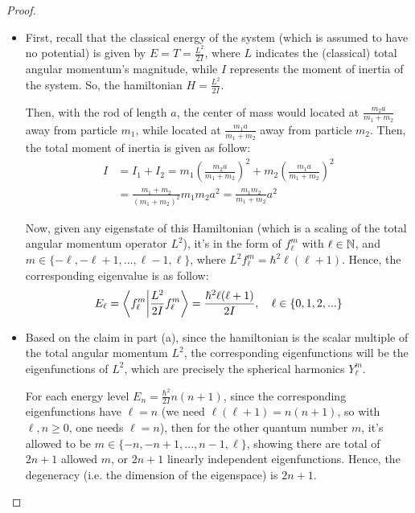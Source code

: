 \documentclass{article}
\begin{document}
\begin{proof}

    \hfil

    \begin{itemize}
        \item[(a)] First, recall that the classical energy of the system (which is assumed to have no potential) is given by $E = T = \frac{L^2}{2I}$, where $L$ indicates the (classical) total angular momentum's magnitude, while $I$ represents the moment of inertia of the system. So, the hamiltonian $H = \frac{L^2}{2I}$. 
        
        Then, with the rod of length $a$, the center of mass would located at $\frac{m_2 a}{m_1+m_2}$ away from particle $m_1$, while located at $\frac{m_1 a}{m_1+m_2}$ away from particle $m_2$. Then, the total moment of inertia is given as follow:
        \begin{align}
            I &= I_1+I_2 = m_1\left(\frac{m_2 a}{m_1+m_2}\right)^2+m_2\left(\frac{m_1 a}{m_1+m_2}\right)^2\\
            &= \frac{m_1+m_2}{(m_1+m_2)^2}m_1m_2a^2 = \frac{m_1m_2}{m_1+m_2}a^2
        \end{align}
        
        Now, given any eigenstate of this Hamiltonian (which is a scaling of the total angular momentum operator $L^2$), it's in the form of $f^m_\ell$ with $\ell\in\mathbb{N}$, and $m\in \{-\ell, -\ell+1,..., \ell-1, \ell\}$, where $L^2 f^m_\ell = \hbar^2 \ell(\ell+1)$. Hence, the corresponding eigenvalue is as follow:
        \begin{align}
            E_\ell = \braket{f^m_\ell}{\frac{L^2}{2I}f^m_\ell} = \frac{\hbar^2\ell(\ell+1)}{2I},\quad \ell\in\{0,1,2,...\}
        \end{align}

        \hfil

        \item[(b)] Based on the claim in part (a), since the hamiltonian is the scalar multiple of the total angular momentum $L^2$, the corresponding eigenfunctions will be the eigenfunctions of $L^2$, which are precisely the spherical harmonics $Y^m_\ell$.
        
        For each energy level $E_n = \frac{\hbar^2}{2I}n(n+1)$, since the corresponding eigenfunctions have $\ell=n$ (we need $\ell(\ell+1)=n(n+1)$, so with $\ell,n\geq 0$, one needs $\ell=n$), then for the other quantum number $m$, it's allowed to be $m\in\{-n,-n+1,...,n-1,\ell\}$, showing there are total of $2n+1$ allowed $m$, or $2n+1$ linearly independent eigenfunctions. Hence, the degeneracy (i.e. the dimension of the eigenspace) is $2n+1$.


\end{itemize}
\end{proof}
\end{document}
